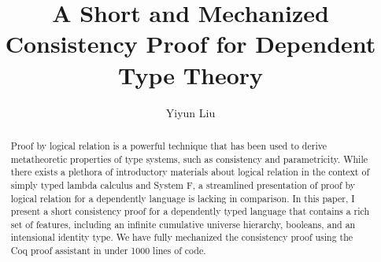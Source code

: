 \documentclass[nonacm]{acmart}
\begin{document}
\title{A Short and Mechanized Consistency Proof for Dependent Type Theory}

\author{Yiyun Liu}


\begin{abstract}
Proof by logical relation is a powerful technique that has been used
to derive metatheoretic properties of type systems, such as
consistency and parametricity. While there exists a
plethora of introductory materials about logical relation in the
context of simply typed lambda calculus and System F, a streamlined
presentation of proof by logical relation for a dependently language
is lacking in comparison. In this paper, I present a short
consistency proof for a dependently typed language that contains a
rich set of features, including an infinite cumulative universe
hierarchy, booleans, and an intensional identity type. We have
fully mechanized the consistency proof using the Coq proof assistant
in under 1000 lines of code.
\end{abstract}


\maketitle
\end{document}
